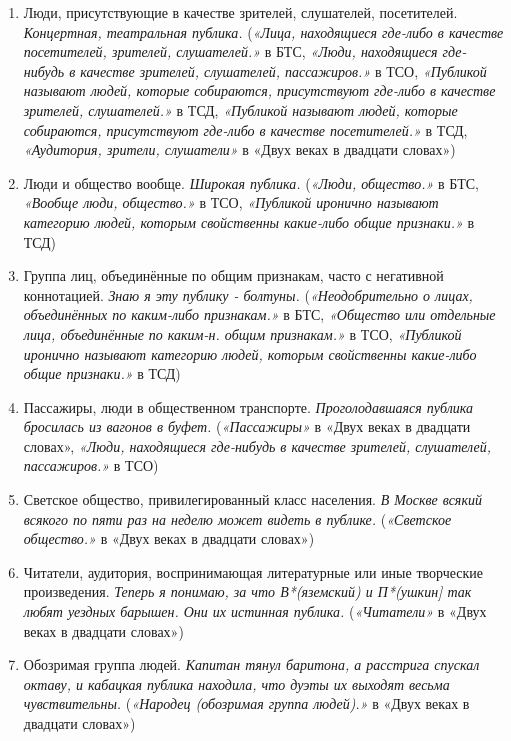 \begin{enumerate}
    \item Люди, присутствующие в качестве зрителей, слушателей, посетителей. \textit{Концертная, театральная публика.}
(\textit{«Лица, находящиеся где-либо в качестве посетителей, зрителей, слушателей.»} в БТС,
\textit{«Люди, находящиеся где-нибудь в качестве зрителей, слушателей, пассажиров.»} в ТСО,
\textit{«Публикой называют людей, которые собираются, присутствуют где-либо в качестве зрителей, слушателей.»} в ТСД,
\textit{«Публикой называют людей, которые собираются, присутствуют где-либо в качестве посетителей.»} в ТСД,
\textit{«Аудитория, зрители, слушатели»} в «Двух веках в двадцати словах»)

    \item Люди и общество вообще. \textit{Широкая публика.}
(\textit{«Люди, общество.»} в БТС,
\textit{«Вообще люди, общество.»} в ТСО,
\textit{«Публикой иронично называют категорию людей, которым свойственны какие-либо общие признаки.»} в ТСД)

    \item Группа лиц, объединённые по общим признакам, часто с негативной коннотацией. \textit{Знаю я эту публику - болтуны.}
(\textit{«Неодобрительно о лицах, объединённых по каким-либо признакам.»} в БТС,
\textit{«Общество или отдельные лица, объединённые по каким-н. общим признакам.»} в ТСО,
\textit{«Публикой иронично называют категорию людей, которым свойственны какие-либо общие признаки.»} в ТСД)

    \item Пассажиры, люди в общественном транспорте. \textit{Проголодавшаяся публика бросилась из вагонов в буфет.}
(\textit{«Пассажиры»} в «Двух веках в двадцати словах»,
\textit{«Люди, находящиеся где-нибудь в качестве зрителей, слушателей, пассажиров.»} в ТСО)

    \item Светское общество, привилегированный класс населения. \textit{В Москве всякий всякого по пяти раз на неделю может видеть в публике.}
(\textit{«Светское общество.»} в «Двух веках в двадцати словах»)

    \item Читатели, аудитория, воспринимающая литературные или иные творческие произведения. \textit{Теперь я понимаю, за что В*(яземский) и П*(ушкин] так любят уездных барышен. Они их истинная публика.}
(\textit{«Читатели»} в «Двух веках в двадцати словах»)

    \item Обозримая группа людей. \textit{Капитан тянул баритона, а расстрига спускал октаву, и кабацкая публика находила, что дуэты их выходят весьма чувствительны.}
(\textit{«Народец (обозримая группа людей).»} в «Двух веках в двадцати словах»)


\end{enumerate}
